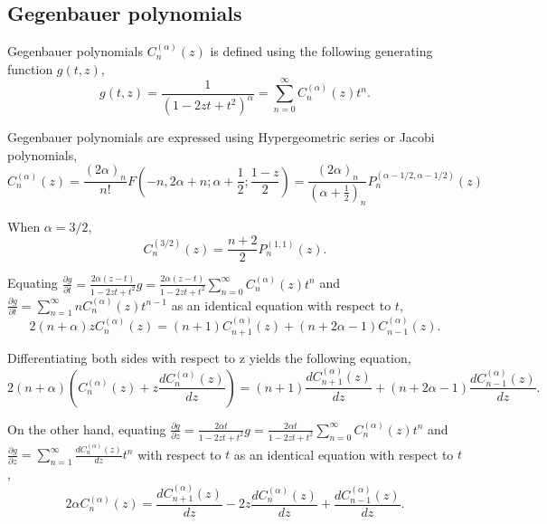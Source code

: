 \documentclass[12pt]{article}
\newcommand{\bibun}[2]{\frac{d {#1}}{d {#2}}}
\newcommand{\henbibun}[2]{\frac{\partial {#1}}{\partial {#2}}}
\begin{document}
\subsection{Gegenbauer polynomials}
Gegenbauer polynomials $C^{(\alpha)}_{n} (z)$ is defined using the following generating function $g(t,z)$,
\begin{equation}
 g(t,z) = \frac{1}{\left(1 - 2zt + t^2\right)^\alpha} = \sum_{n=0}^{\infty} C^{(\alpha)}_{n} (z) t^n.
\end{equation}

Gegenbauer polynomials are expressed using Hypergeometric series or Jacobi polynomials,
\begin{equation}
 C^{(\alpha)}_{n} (z) = \frac{(2\alpha)_n}{n!} F \left(-n, 2\alpha + n; \alpha+\frac{1}{2}; \frac{1-z}{2}\right) = \frac{(2\alpha)_n}{\left(\alpha + \frac{1}{2}\right)_n} P^{(\alpha - 1/2,\alpha - 1/2)}_{n} (z)
\end{equation}

When $\alpha=3/2$,
\begin{equation}
 C^{(3/2)}_{n} (z) = \frac{n+2}{2} P^{(1,1)}_{n} (z).
\end{equation}

Equating $\henbibun{g}{t} = \frac{2\alpha (z-t)}{1 - 2zt + t^2} g = \frac{2\alpha (z-t)}{1 - 2zt + t^2} \sum_{n=0}^{\infty} C^{(\alpha)}_{n} (z) t^n$ and
$\henbibun{g}{t} = \sum_{n=1}^{\infty} nC^{(\alpha)}_{n} (z) t^{n-1}$ as an identical equation with respect to $t$,
\begin{equation}
 2(n+\alpha)z C^{(\alpha)}_{n} (z) = (n+1) C^{(\alpha)}_{n+1}(z) + (n+2\alpha - 1) C^{(\alpha)}_{n-1}(z).
\end{equation}

Differentiating both sides with respect to z yields the following equation,
\begin{equation}
 2(n+\alpha) \left( C^{(\alpha)}_{n} (z) +  z \bibun{C^{(\alpha)}_{n} (z)}{z} \right) = (n+1) \bibun{C^{(\alpha)}_{n+1}(z)}{z} + (n+2\alpha - 1) \bibun{C^{(\alpha)}_{n-1}(z)}{z}.\label{gegen_dg_dt}
\end{equation}

On the other hand, equating $\henbibun{g}{z} = \frac{2\alpha t}{1-2zt+t^2} g = \frac{2\alpha t}{1-2zt+t^2} \sum_{n=0}^{\infty} C^{(\alpha)}_{n} (z) t^n$ and
$\henbibun{g}{z} = \sum_{n=1}^{\infty} \bibun{C^{(\alpha)}_{n} (z)}{z} t^{n}$ with respect to $t$ as an identical equation with respect to $t$,
\begin{equation}
 2\alpha C^{(\alpha)}_{n} (z) = \bibun{C^{(\alpha)}_{n+1} (z)}{z} - 2z \bibun{C^{(\alpha)}_{n} (z)}{z} + \bibun{C^{(\alpha)}_{n-1} (z)}{z}.\label{gegen_dg_dz}
\end{equation}
\end{document}

